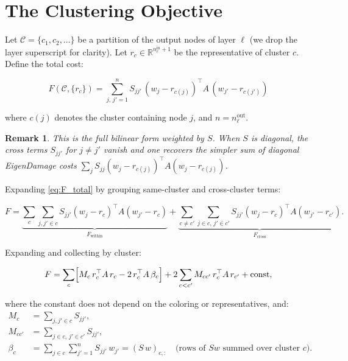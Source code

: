 \documentclass[11pt]{article}
\newtheorem{remark}{Remark}
\begin{document}
\section{The Clustering Objective}

Let $\mathcal{C} = \{c_1, c_2, \ldots\}$ be a partition of the output nodes
of layer $\ell$ (we drop the layer superscript for clarity). Let $r_c \in
\mathbb{R}^{n_\ell^{\mathrm{in}}+1}$ be the representative of cluster $c$.
Define the total cost:

\begin{equation}
  \boxed{F(\mathcal{C}, \{r_c\}) = \sum_{j,\,j'=1}^{n} S_{jj'}\,
  (w_j - r_{c(j)})^{\top} A\,(w_{j'} - r_{c(j')})}
  \label{eq:F_total}
\end{equation}

where $c(j)$ denotes the cluster containing node $j$, and $n = n_\ell^{\mathrm{out}}$.

\begin{remark}
This is the full bilinear form weighted by $S$. When $S$ is diagonal, the
cross terms $S_{jj'}$ for $j \neq j'$ vanish and one recovers the simpler
sum of diagonal EigenDamage costs $\sum_j S_{jj}(w_j - r_{c(j)})^\top A
(w_j - r_{c(j)})$.
\end{remark}

Expanding \eqref{eq:F_total} by grouping same-cluster and cross-cluster terms:

\begin{equation}
  F = \underbrace{\sum_{c}\sum_{j,j'\in c} S_{jj'}(w_j - r_c)^\top A (w_{j'} - r_c)}_{F_{\mathrm{within}}}
  + \underbrace{\sum_{c \neq c'}\sum_{j\in c,\,j'\in c'} S_{jj'}(w_j - r_c)^\top A (w_{j'} - r_{c'})}_{F_{\mathrm{cross}}}.
  \label{eq:F_split}
\end{equation}

Expanding and collecting by cluster:

\begin{equation}
  F = \sum_c \Bigl[M_c\,r_c^\top A\,r_c - 2\,r_c^\top A\,\beta_c\Bigr]
    + 2\sum_{c < c'} M_{cc'}\,r_c^\top A\,r_{c'} + \mathrm{const},
  \label{eq:F_expanded}
\end{equation}

where the constant does not depend on the coloring or representatives, and:
\begin{align}
  M_c      &= \sum_{j,j'\in c} S_{jj'},       \label{eq:M_c}\\
  M_{cc'}  &= \sum_{j\in c,\,j'\in c'} S_{jj'},\label{eq:M_cc}\\
  \beta_c  &= \sum_{j\in c}\sum_{j'=1}^{n} S_{jj'}\,w_{j'}
             = (S\,w)_{c,:} \quad \text{(rows of $Sw$ summed over cluster $c$)}.
             \label{eq:beta}
\end{align}
\end{document}

